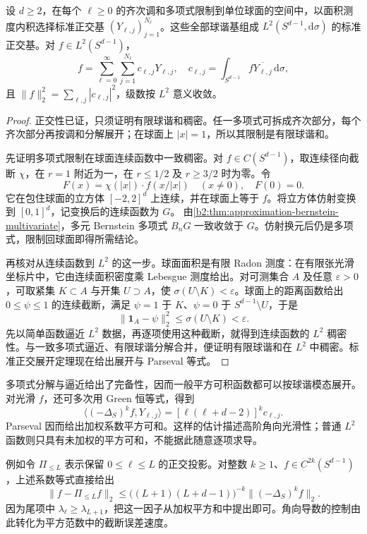 \begin{theorem}[球谐展开]
\label{b2:thm:B2-spherical-expansion}
设 \(d\geq2\)，在每个 \(\ell\geq0\) 的齐次调和多项式限制到单位球面的空间中，以面积测度内积选择标准正交基 \((Y_{\ell,j})_{j=1}^{N_\ell}\)。这些全部球谐基组成 \(L^2(S^{d-1},\mathrm d\sigma)\) 的标准正交基。对 \(f\in L^2(S^{d-1})\)，
\[f=\sum_{\ell=0}^\infty\sum_{j=1}^{N_\ell}c_{\ell,j}Y_{\ell,j},\quad
 c_{\ell,j}=\int_{S^{d-1}}f\overline{Y_{\ell,j}}\,\mathrm d\sigma,
\]
且 \(\lVert f\rVert_2^2=\sum_{\ell,j}|c_{\ell,j}|^2\)，级数按 \(L^2\) 意义收敛。
\end{theorem}
\begin{proof}
正交性已证，只须证明有限球谐和稠密。任一多项式可拆成齐次部分，每个齐次部分再按调和分解展开；在球面上 \(|x|=1\)，所以其限制是有限球谐和。

先证明多项式限制在球面连续函数中一致稠密。对
\(f\in C(S^{d-1})\)，取连续径向截断 \(\chi\)，在 \(r=1\) 附近为一，在 \(r\leq1/2\) 及 \(r\geq3/2\) 时为零。令
\[
 F(x)=\chi(|x|)\cdot f(x/|x|)
 \quad(x\ne0),\quad F(0)=0.
\]
它在包住球面的立方体 \([-2,2]^d\) 上连续，并在球面上等于 \(f\)。将立方体仿射变换到 \([0,1]^d\)，记变换后的连续函数为 \(G\)。
由\cref{b2:thm:approximation-bernstein-multivariate}，多元 Bernstein 多项式 \(B_nG\) 一致收敛于 \(G\)。仿射换元后仍是多项式，限制回球面即得所需结论。

再核对从连续函数到 \(L^2\) 的这一步。球面面积是有限 Radon 测度：在有限张光滑坐标片中，它由连续面积密度乘 Lebesgue 测度给出。对可测集合 \(A\) 及任意 \(\varepsilon>0\)，可取紧集 \(K\subset A\) 与开集 \(U\supset A\)，使
\(\sigma(U\setminus K)<\varepsilon\)。球面上的距离函数给出
\(0\leq\psi\leq1\) 的连续截断，满足 \(\psi=1\) 于 \(K\)、\(\psi=0\) 于 \(S^{d-1}\setminus U\)，于是
\[
 \|\mathbf1_A-\psi\|_2^2\leq\sigma(U\setminus K)<\varepsilon.
\]
先以简单函数逼近 \(L^2\) 数据，再逐项使用这种截断，就得到连续函数的 \(L^2\) 稠密性。与一致多项式逼近、有限球谐分解合并，便证明有限球谐和在 \(L^2\) 中稠密。标准正交展开定理现在给出展开与 Parseval 等式。
\end{proof}

多项式分解与逼近给出了完备性，因而一般平方可积函数都可以按球谐模态展开。对光滑 \(f\)，还可多次用 Green 恒等式，得到
\[\langle(-\Delta_S)^kf,Y_{\ell,j}\rangle
 =[\ell(\ell+d-2)]^kc_{\ell,j}.\]
Parseval 因而给出加权系数平方可和。这样的估计描述高阶角向光滑性；普通 \(L^2\) 函数则只具有未加权的平方可和，不能据此随意逐项求导。

\ProseParagraphBreak

例如令 \(\Pi_{\leq L}\) 表示保留 \(0\leq\ell\leq L\) 的正交投影。对整数 \(k\geq1\)、\(f\in C^{2k}(S^{d-1})\)，上述系数等式直接给出
\[
 \|f-\Pi_{\leq L}f\|_2
 \leq\bigl((L+1)(L+d-1)\bigr)^{-k}
       \|(-\Delta_S)^kf\|_2.
\]
因为尾项中 \(\lambda_\ell\geq\lambda_{L+1}\)，把这一因子从加权平方和中提出即可。角向导数的控制由此转化为平方范数中的截断误差速度。

